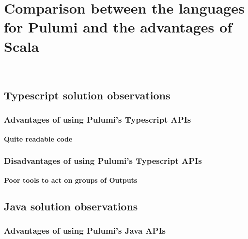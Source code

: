 
\chapter{Comparison between the languages for Pulumi and the advantages of Scala}
\label{cap:comparisons}

\\

\section{Typescript solution observations}

\subsection{Advantages of using Pulumi's Typescript APIs}

\subsubsection{Quite readable code}

\subsection{Disadvantages of using Pulumi's Typescript APIs}

\subsubsection{Poor tools to act on groups of Outputs}

\section{Java solution observations}

\subsection{Advantages of using Pulumi's Java APIs}

